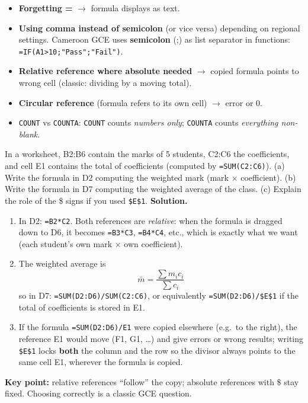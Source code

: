 \documentclass[11pt]{article}
\begin{document}
\begin{attention}
\begin{itemize}
\item \textbf{Forgetting =} $\rightarrow$ formula displays as text.
\item \textbf{Using comma instead of semicolon} (or vice versa) depending on regional settings. Cameroon GCE uses \textbf{semicolon} (;) as list separator in functions: \texttt{=IF(A1>10;"Pass";"Fail")}.
\item \textbf{Relative reference where absolute needed} $\rightarrow$ copied formula points to wrong cell (classic: dividing by a moving total).
\item \textbf{Circular reference} (formula refers to its own cell) $\rightarrow$ error or 0.
\item \texttt{COUNT} vs \texttt{COUNTA}: \texttt{COUNT} counts \emph{numbers only}; \texttt{COUNTA} counts \emph{everything non-blank}.
\end{itemize}
\end{attention}

\begin{exoresolu}
In a worksheet, B2:B6 contain the marks of 5 students, C2:C6 the coefficients, and cell E1 contains the total of coefficients (computed by \texttt{=SUM(C2:C6)}). (a) Write the formula in D2 computing the weighted mark (mark $\times$ coefficient). (b) Write the formula in D7 computing the weighted average of the class. (c) Explain the role of the \$ signs if you used \texttt{\$E\$1}.
\tcblower
\textbf{Solution.}
\begin{enumerate}
\item[(a)] In D2: \texttt{=B2*C2}. Both references are \emph{relative}: when the formula is dragged down to D6, it becomes \texttt{=B3*C3}, \texttt{=B4*C4}, etc., which is exactly what we want (each student's own mark $\times$ own coefficient).
\item[(b)] The weighted average is
\[ \bar{m}=\frac{\sum m_i c_i}{\sum c_i} \]
so in D7: \texttt{=SUM(D2:D6)/SUM(C2:C6)}, or equivalently \texttt{=SUM(D2:D6)/\$E\$1} if the total of coefficients is stored in E1.
\item[(c)] If the formula \texttt{=SUM(D2:D6)/E1} were copied elsewhere (e.g.\ to the right), the reference E1 would move (F1, G1, \ldots) and give errors or wrong results; writing \texttt{\$E\$1} locks \textbf{both} the column and the row so the divisor always points to the same cell E1, wherever the formula is copied.
\end{enumerate}
\textbf{Key point:} relative references ``follow'' the copy; absolute references with \$ stay fixed. Choosing correctly is a classic GCE question.
\end{exoresolu}
\end{document}
